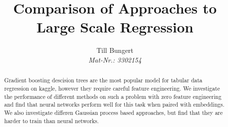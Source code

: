 \documentclass[12pt]{article}
\title{Comparison of Approaches to Large Scale Regression}
\author{Till Bungert\\
    \emph{Mat-Nr.: 3302154}\\
\emph{\email{bungert@stud.uni-heidelberg.de}}}
\begin{document}
\maketitle

\begin{abstract}
    Gradient boosting descision trees are the most popular model for tabular
    data regression on kaggle, however they require careful feature
    engineering. We investigate the performance of different methods on such a
    problem with zero feature engineering and find that neural networks perform
    well for this task when paired with embeddings. We also investigate
    differen Gaussian process based approaches, but find that they are harder
    to train than neural networks.
\end{abstract}

\onehalfspacing







\clearpage
\printbibliography
\end{document}
